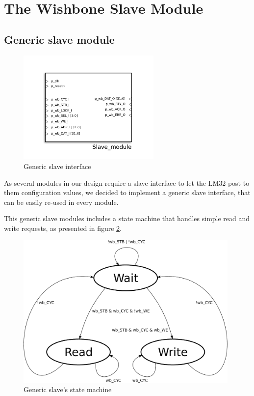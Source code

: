 
\section{The Wishbone Slave Module}

\subsection{Generic slave module}

\begin{figure}[H]
\center
\includegraphics[width=7cm]{figs/slave_symbol.pdf}
\caption{Generic slave interface}
\label{generic_slave_interface}
\end{figure}

As several modules in our design require a slave interface to let the LM32 post to them configuration values, we decided to implement a generic slave interface, that can be easily re-used in every module.

This generic slave modules includes a state machine that handles simple read and write requests, as presented in figure \ref{state_machine_slave}.

\begin{figure}[h]
\center
\includegraphics[width=11cm]{figs/slave_state_machine.pdf}
\caption{Generic slave's state machine}
\label{state_machine_slave}
\end{figure}

